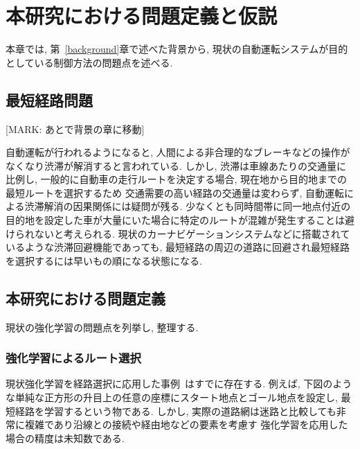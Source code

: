 \chapter{本研究における問題定義と仮説}
\label{issue}

本章では, 第~\ref{background}章で述べた背景から, 現状の自動運転システムが目的としている制御方法の問題点を述べる.

\section{最短経路問題}

[MARK: あとで背景の章に移動]

自動運転が行われるようになると, 人間による非合理的なブレーキなどの操作がなくなり渋滞が解消すると言われている.
しかし, 渋滞は車線あたりの交通量に比例し, 一般的に自動車の走行ルートを決定する場合, 現在地から目的地までの最短ルートを選択するため
交通需要の高い経路の交通量は変わらず, 自動運転による渋滞解消の因果関係には疑問が残る.
少なくとも同時間帯に同一地点付近の目的地を設定した車が大量にいた場合に特定のルートが混雑が発生することは避けられないと考えられる.
現状のカーナビゲーションシステムなどに搭載されているような渋滞回避機能であっても, 最短経路の周辺の道路に回避され最短経路を選択するには早いもの順になる状態になる.

\section{本研究における問題定義}

現状の強化学習の問題点を列挙し, 整理する.

\subsection{強化学習によるルート選択}

現状強化学習を経路選択に応用した事例~\cite{DQNRouteSimple}はすでに存在する. 例えば, 下図のような単純な正方形の升目上の任意の座標にスタート地点とゴール地点を設定し, 最短経路を学習するという物である. 
しかし, 実際の道路網は迷路と比較しても非常に複雑であり沿線との接続や経由地などの要素を考慮す
強化学習を応用した場合の精度は未知数である.



